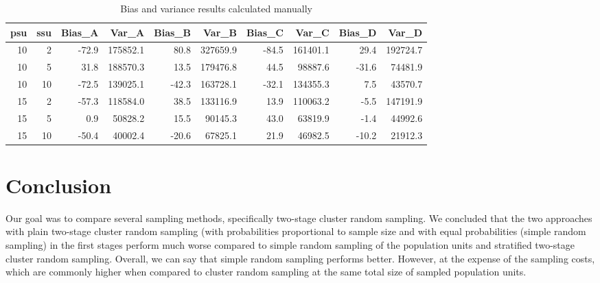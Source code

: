 \documentclass{article}
\begin{document}
\begin{table}[htbp]
\centering
\begin{tabular}{rrrrrrrrrr}
\hline
psu & ssu & Bias\_A & Var\_A & Bias\_B & Var\_B & Bias\_C & Var\_C & Bias\_D & Var\_D \\
\hline
10 & 2  &  -72.9 & 175852.1 &  80.8  & 327659.9 &  -84.5 & 161401.1 &  29.4  & 192724.7 \\
10 & 5  &   31.8 & 188570.3 &  13.5  & 179476.8 &   44.5 &  98887.6 & -31.6  &  74481.9 \\
10 & 10 &  -72.5 & 139025.1 & -42.3  & 163728.1 &  -32.1 & 134355.3 &   7.5  &  43570.7 \\
15 & 2  &  -57.3 & 118584.0 &  38.5  & 133116.9 &   13.9 & 110063.2 &  -5.5  & 147191.9 \\
15 & 5  &    0.9 &  50828.2 &  15.5  &  90145.3 &   43.0 &  63819.9 &  -1.4  &  44992.6 \\
15 & 10 &  -50.4 &  40002.4 & -20.6  &  67825.1 &   21.9 &  46982.5 & -10.2  &  21912.3 \\
\hline
\end{tabular}
\caption{Bias and variance results calculated manually}
\label{tab:bias_variance_empirical}
\end{table}


\section{Conclusion}
Our goal was to compare several sampling methods, specifically two-stage cluster random sampling. We concluded that the two approaches with plain two-stage cluster random sampling (with probabilities proportional to sample size and with equal probabilities (simple random sampling) in the first stages perform much worse compared to simple random sampling of the population units and stratified two-stage cluster random sampling. Overall, we can say that simple random sampling performs better. However, at the expense of the sampling costs, which are commonly higher when compared to cluster random sampling at the same total size of sampled population units.



\clearpage
\FloatBarrier
\end{document}
